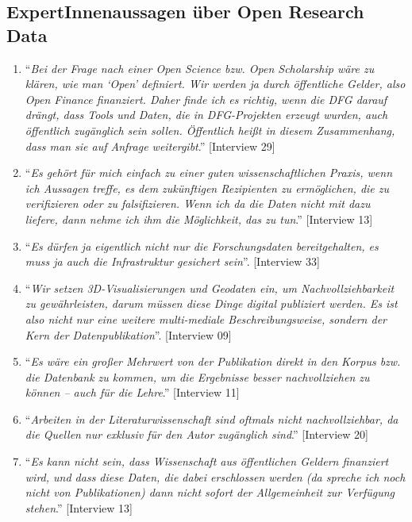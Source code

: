 \documentclass[a4paper,
fontsize=11pt,
oneside,
numbers=noperiodatend,
parskip=half-,
bibliography=totoc,
final
]{scrartcl}
\begin{document}
\subsection{ExpertInnenaussagen über Open Research
Data}\label{expertinnenaussagen-uxfcber-open-research-data}

\begin{enumerate}
\def\labelenumi{\arabic{enumi}.}
\item
  \enquote{\emph{Bei der Frage nach einer Open Science bzw. Open
  Scholarship wäre zu klären, wie man \enquote{Open} definiert. Wir
  werden ja durch öffentliche Gelder, also Open Finance finanziert.
  Daher finde ich es richtig, wenn die DFG darauf drängt, dass Tools und
  Daten, die in DFG-Projekten erzeugt wurden, auch öffentlich zugänglich
  sein sollen. Öffentlich heißt in diesem Zusammenhang, dass man sie auf
  Anfrage weitergibt}.} {[}Interview 29{]}
\item
  \enquote{\emph{Es gehört für mich einfach zu einer guten
  wissenschaftlichen Praxis, wenn ich Aussagen treffe, es dem
  zukünftigen Rezipienten zu ermöglichen, die zu verifizieren oder zu
  falsifizieren. Wenn ich da die Daten nicht mit dazu liefere, dann
  nehme ich ihm die Möglichkeit, das zu tun}.} {[}Interview 13{]}
\item
  \enquote{\emph{Es dürfen ja eigentlich nicht nur die Forschungsdaten
  bereitgehalten, es muss ja auch die Infrastruktur gesichert sein}}.
  {[}Interview 33{]}
\item
  \enquote{\emph{Wir setzen 3D-Visualisierungen und Geodaten ein, um
  Nachvollziehbarkeit zu gewährleisten, darum müssen diese Dinge digital
  publiziert werden. Es ist also nicht nur eine weitere multi-mediale
  Beschreibungsweise, sondern der Kern der Datenpublikation}}.
  {[}Interview 09{]}
\item
  \enquote{\emph{Es wäre ein großer Mehrwert von der Publikation direkt
  in den Korpus bzw. die Datenbank zu kommen, um die Ergebnisse besser
  nachvollziehen zu können -- auch für die Lehre}.} {[}Interview 11{]}
\item
  \enquote{\emph{Arbeiten in der Literaturwissenschaft sind oftmals
  nicht nachvollziehbar, da die Quellen nur exklusiv für den Autor
  zugänglich sind}.} {[}Interview 20{]}
\item
  \enquote{\emph{Es kann nicht sein, dass Wissenschaft aus öffentlichen
  Geldern finanziert wird, und dass diese Daten, die dabei erschlossen
  werden (da spreche ich noch nicht von Publikationen) dann nicht sofort
  der Allgemeinheit zur Verfügung stehen}.} {[}Interview 13{]}

\end{enumerate}
\end{document}
